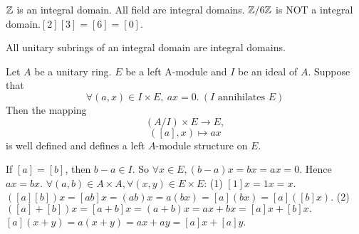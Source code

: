 \begin{exampleenv}
    \quad \newline
    $\mathbb{Z}$ is an integral domain.
    \newline
     All field are integral domains.
     \newline
      $\mathbb{Z}/6\mathbb{Z}$ is NOT a integral domain.$[2][3]=[6]=[0].$
\end{exampleenv}
\begin{propositionenv}
    All unitary subrings of an integral domain are integral domains.
\end{propositionenv}
\begin{propositionenv}
    Let $A$ be a unitary ring. $E$ be a left A-module and $I$ be an ideal of $A$. Suppose that 
    $$\forall (a,x)\in I\times E,\ ax=0.\ (I\text{ annihilates }E)$$
    Then the mapping
    $$\left(A/I\right)\times E\longrightarrow E,$$
    $$\left([a],x\right)\longmapsto ax$$
    is well defined and defines a left $A$-module structure on $E$.
\end{propositionenv}
\begin{proofenv}
    If $[a]=[b]$, then $b-a\in I$. So $\forall x\in E, (b-a)x=bx=ax=0$. Hence $ax=bx$. $\forall (a,b)\in A\times A,\forall (x,y)\in E\times E$:
    \newline
    (1) $[1]x=1x=x.$ $\left([a][b]\right)x=[ab]x=(ab)x=a(bx)=[a](bx)=[a]([b]x)$.
    \newline
    (2) $\left([a]+[b]\right)x=[a+b]x=(a+b)x=ax+bx=[a]x+[b]x.$ $[a](x+y)=a(x+y)=ax+ay=[a]x+[a]y$.
\end{proofenv}



